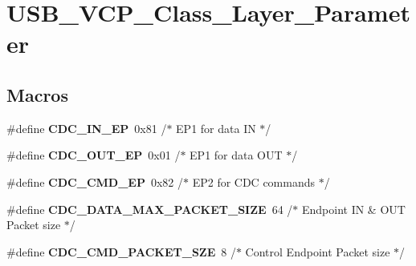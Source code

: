 \hypertarget{group__USB__VCP__Class__Layer__Parameter}{\section{U\-S\-B\-\_\-\-V\-C\-P\-\_\-\-Class\-\_\-\-Layer\-\_\-\-Parameter}
\label{group__USB__VCP__Class__Layer__Parameter}
}
\subsection*{Macros}
\begin{DoxyCompactItemize}
\item 
\hypertarget{group__USB__VCP__Class__Layer__Parameter_ga4f4f597c2cc62e7ec1c6ac609b3eb97f}{\#define {\bfseries C\-D\-C\-\_\-\-I\-N\-\_\-\-E\-P}~0x81  /$\ast$ E\-P1 for data I\-N $\ast$/}\label{group__USB__VCP__Class__Layer__Parameter_ga4f4f597c2cc62e7ec1c6ac609b3eb97f}

\item 
\hypertarget{group__USB__VCP__Class__Layer__Parameter_ga7623890bcaec261a69ba4622909f065c}{\#define {\bfseries C\-D\-C\-\_\-\-O\-U\-T\-\_\-\-E\-P}~0x01  /$\ast$ E\-P1 for data O\-U\-T $\ast$/}\label{group__USB__VCP__Class__Layer__Parameter_ga7623890bcaec261a69ba4622909f065c}

\item 
\hypertarget{group__USB__VCP__Class__Layer__Parameter_gaeca7f5392ff4fc889eeb511d7d09ce75}{\#define {\bfseries C\-D\-C\-\_\-\-C\-M\-D\-\_\-\-E\-P}~0x82  /$\ast$ E\-P2 for C\-D\-C commands $\ast$/}\label{group__USB__VCP__Class__Layer__Parameter_gaeca7f5392ff4fc889eeb511d7d09ce75}

\item 
\hypertarget{group__USB__VCP__Class__Layer__Parameter_ga59b9d830eb69ab0c77335218ead3e7fe}{\#define {\bfseries C\-D\-C\-\_\-\-D\-A\-T\-A\-\_\-\-M\-A\-X\-\_\-\-P\-A\-C\-K\-E\-T\-\_\-\-S\-I\-Z\-E}~64   /$\ast$ Endpoint I\-N \& O\-U\-T Packet size $\ast$/}\label{group__USB__VCP__Class__Layer__Parameter_ga59b9d830eb69ab0c77335218ead3e7fe}

\item 
\hypertarget{group__USB__VCP__Class__Layer__Parameter_ga50817cddb41e095f552eb896f33961ca}{\#define {\bfseries C\-D\-C\-\_\-\-C\-M\-D\-\_\-\-P\-A\-C\-K\-E\-T\-\_\-\-S\-Z\-E}~8    /$\ast$ Control Endpoint Packet size $\ast$/}\label{group__USB__VCP__Class__Layer__Parameter_ga50817cddb41e095f552eb896f33961ca}


\end{DoxyCompactItemize}
